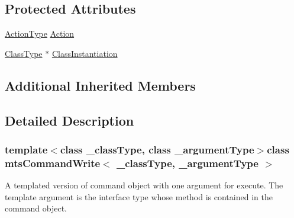 \subsection*{Protected Attributes}
\begin{DoxyCompactItemize}
\item 
\hyperlink{classmts_command_write_a1327ec4d03afcafbbbd91c8fc3f3c090}{Action\-Type} \hyperlink{classmts_command_write_affee375369797c3ffb3aba6578d33b23}{Action}
\item 
\hyperlink{classmts_command_write_aeccc8c434133c4adae34916b42ad493c}{Class\-Type} $\ast$ \hyperlink{classmts_command_write_accc06c909f9145a73c5e56ea64e08872}{Class\-Instantiation}
\end{DoxyCompactItemize}
\subsection*{Additional Inherited Members}


\subsection{Detailed Description}
\subsubsection*{template$<$class \-\_\-class\-Type, class \-\_\-argument\-Type$>$class mts\-Command\-Write$<$ \-\_\-class\-Type, \-\_\-argument\-Type $>$}

A templated version of command object with one argument for execute. The template argument is the interface type whose method is contained in the command object. 

